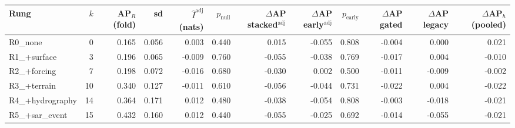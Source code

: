 \begin{tabular}{lrrrrrrrrrrr}
\toprule
Rung & $k$ & AP$_R$ (fold) & sd & $\hat I^{\mathrm{adj}}$ (nats) & $p_{\mathrm{null}}$ & $\Delta$AP stacked$^{\mathrm{adj}}$ & $\Delta$AP early$^{\mathrm{adj}}$ & $p_{\mathrm{early}}$ & $\Delta$AP gated & $\Delta$AP legacy & $\Delta$AP$_h$ (pooled) \\
\midrule
R0\_none & 0 & 0.165 & 0.056 & 0.003 & 0.440 & 0.015 & -0.055 & 0.808 & -0.004 & 0.000 & 0.021 \\
R1\_+surface & 3 & 0.196 & 0.065 & -0.009 & 0.760 & -0.055 & -0.038 & 0.769 & -0.017 & 0.004 & -0.010 \\
R2\_+forcing & 7 & 0.198 & 0.072 & -0.016 & 0.680 & -0.030 & 0.002 & 0.500 & -0.011 & -0.009 & -0.002 \\
R3\_+terrain & 10 & 0.340 & 0.127 & -0.011 & 0.610 & -0.056 & -0.044 & 0.731 & -0.022 & 0.004 & -0.022 \\
R4\_+hydrography & 14 & 0.364 & 0.171 & 0.012 & 0.480 & -0.038 & -0.054 & 0.808 & -0.003 & -0.018 & -0.021 \\
R5\_+sar\_event & 15 & 0.432 & 0.160 & 0.012 & 0.440 & -0.055 & -0.025 & 0.692 & -0.014 & -0.055 & -0.021 \\
\bottomrule
\end{tabular}
